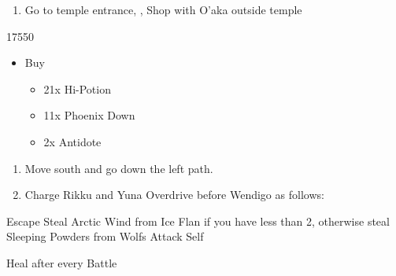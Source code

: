 \begin{enumerate}[resume]
	\item Go to temple entrance, \sd, Shop with O'aka outside temple
\end{enumerate}
\begin{shop}{17550}
	\begin{itemize}
		\item Buy
			\begin{itemize}
				\item 21x Hi-Potion
				\item 11x Phoenix Down
				\item 2x Antidote
			\end{itemize}
	\end{itemize}
\end{shop}
\begin{enumerate}[resume]
	\item Move south and go down the left path.
	\item Charge Rikku and Yuna Overdrive before Wendigo as follows:
\end{enumerate}
\begin{encounters}
	\begin{itemize}
		\tidusf Escape
		\rikkuf Steal Arctic Wind from Ice Flan if you have less than 2, otherwise steal Sleeping Powders from Wolfs
		\yunaf Attack Self
	\end{itemize}
	Heal after every Battle
\end{encounters}
